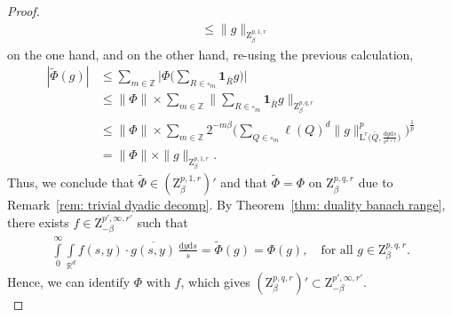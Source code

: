 \documentclass[11pt, leqno,parskip=half]{amsart}
\theoremstyle{definition}
\newcommand{\IR}{\mathbb{R}}
\newcommand{\IZ}{\mathbb{Z}}
\renewcommand{\L}{\mathrm{L}}
\newcommand{\Z}{\mathrm{Z}}
\renewcommand{\d}{\mathrm{d}}
\numberwithin{equation}{section}
\begin{document}
\begin{proof}
\begin{align*}
        &\leq \|g\|_{\Z^{p,1,r}_\beta}
    \end{align*}
    on the one hand, and on the other hand, re-using the previous calculation,
    \begin{align*}
        |\tilde \Phi (g)|&\leq  \sum\limits_{m\in\IZ} \Big|\Phi\Big(\sum\limits_{R\in\square_m} \mathbf{1}_{\bar R}g \Big)\Big|\\
        &\leq \|\Phi\| \times \sum\limits_{m\in\IZ}
        \Big\|\sum\limits_{R\in\square_m} \mathbf{1}_{\bar R}g  \Big\|_{\Z^{p,q,r}_\beta}\\
        &\leq  \|\Phi\| \times \sum\limits_{m\in\IZ} 2^{-m\beta } \Big(\sum\limits_{Q\in\square_m} \ell(Q)^d \|g\|_{\L^r\big(\bar Q, \frac{\d y \d s}{s^{d+1}}\big)}^p\Big)^\frac{1}{p}\\
        &= \|\Phi\| \times\|g\|_{\Z^{p,1,r}_\beta}.
    \end{align*}
    Thus, we conclude that $\tilde \Phi \in (\Z^{p,1,r}_\beta)'$ and that $\tilde \Phi = \Phi$ on $\Z^{p,q,r}_\beta$ due to Remark~\ref{rem: trivial dyadic decomp}. By Theorem~\ref{thm: duality banach range}, there exists $f \in \Z^{p',\infty,r'}_{-\beta}$ such that
    \begin{align*}
        \int\limits_{0}^\infty\int\limits_{\IR^d} f(s,y) \cdot \overline{g(s,y)} \,\frac{\d y \d s}{s} = \tilde \Phi(g) = \Phi(g),\quad \text{for all $g \in \Z^{p,q,r}_\beta$.}
    \end{align*}
    Hence, we can identify $\Phi$ with $f$, which gives $(\Z^{p,q,r}_\beta)' \subset  \Z^{p',\infty,r'}_{-\beta}$.\\


\end{proof}
\end{document}
